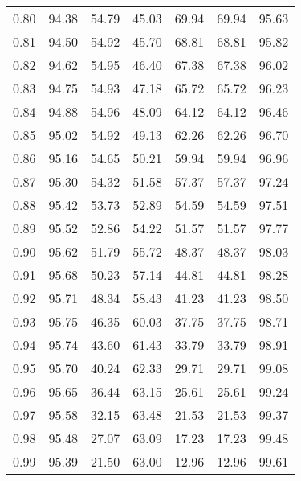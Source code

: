\begin{tabular}{|c|c|c|c|c|c|c|}
      0.80 &     94.38 &     54.79 &      45.03 &   69.94 &      69.94 &         95.63 \\
      0.81 &     94.50 &     54.92 &      45.70 &   68.81 &      68.81 &         95.82 \\
      0.82 &     94.62 &     54.95 &      46.40 &   67.38 &      67.38 &         96.02 \\
      0.83 &     94.75 &     54.93 &      47.18 &   65.72 &      65.72 &         96.23 \\
      0.84 &     94.88 &     54.96 &      48.09 &   64.12 &      64.12 &         96.46 \\
      0.85 &     95.02 &     54.92 &      49.13 &   62.26 &      62.26 &         96.70 \\
      0.86 &     95.16 &     54.65 &      50.21 &   59.94 &      59.94 &         96.96 \\
      0.87 &     95.30 &     54.32 &      51.58 &   57.37 &      57.37 &         97.24 \\
      0.88 &     95.42 &     53.73 &      52.89 &   54.59 &      54.59 &         97.51 \\
      0.89 &     95.52 &     52.86 &      54.22 &   51.57 &      51.57 &         97.77 \\
      0.90 &     95.62 &     51.79 &      55.72 &   48.37 &      48.37 &         98.03 \\
      0.91 &     95.68 &     50.23 &      57.14 &   44.81 &      44.81 &         98.28 \\
      0.92 &     95.71 &     48.34 &      58.43 &   41.23 &      41.23 &         98.50 \\
      0.93 &     95.75 &     46.35 &      60.03 &   37.75 &      37.75 &         98.71 \\
      0.94 &     95.74 &     43.60 &      61.43 &   33.79 &      33.79 &         98.91 \\
      0.95 &     95.70 &     40.24 &      62.33 &   29.71 &      29.71 &         99.08 \\
      0.96 &     95.65 &     36.44 &      63.15 &   25.61 &      25.61 &         99.24 \\
      0.97 &     95.58 &     32.15 &      63.48 &   21.53 &      21.53 &         99.37 \\
      0.98 &     95.48 &     27.07 &      63.09 &   17.23 &      17.23 &         99.48 \\
      0.99 &     95.39 &     21.50 &      63.00 &   12.96 &      12.96 &         99.61 \\
\bottomrule
\end{tabular}
